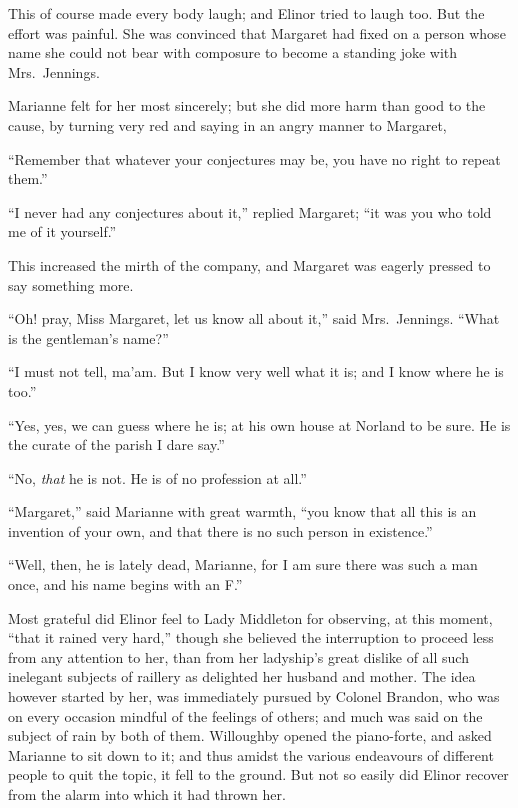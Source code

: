 \documentclass{article}
\begin{document}
This of course made every body laugh; and Elinor
tried to laugh too.  But the effort was painful.
She was convinced that Margaret had fixed on a person
whose name she could not bear with composure to become
a standing joke with Mrs.\ Jennings.

Marianne felt for her most sincerely; but she did
more harm than good to the cause, by turning very red
and saying in an angry manner to Margaret,

``Remember that whatever your conjectures may be,
you have no right to repeat them.''

``I never had any conjectures about it,'' replied Margaret;
``it was you who told me of it yourself.''

This increased the mirth of the company, and Margaret
was eagerly pressed to say something more.

``Oh! pray, Miss Margaret, let us know all about it,''
said Mrs.\ Jennings.  ``What is the gentleman's name?''

``I must not tell, ma'am. But I know very well what it is;
and I know where he is too.''

``Yes, yes, we can guess where he is; at his own house
at Norland to be sure.  He is the curate of the parish
I dare say.''

``No, \emph{that} he is not.  He is of no profession at all.''

``Margaret,'' said Marianne with great warmth,
``you know that all this is an invention of your own,
and that there is no such person in existence.''

``Well, then, he is lately dead, Marianne, for I
am sure there was such a man once, and his name begins
with an F.''

Most grateful did Elinor feel to Lady Middleton
for observing, at this moment, ``that it rained very hard,''
though she believed the interruption to proceed less from
any attention to her, than from her ladyship's great dislike
of all such inelegant subjects of raillery as delighted
her husband and mother.  The idea however started by her,
was immediately pursued by Colonel Brandon, who was
on every occasion mindful of the feelings of others;
and much was said on the subject of rain by both of them.
Willoughby opened the piano-forte, and asked Marianne
to sit down to it; and thus amidst the various endeavours
of different people to quit the topic, it fell to the ground.
But not so easily did Elinor recover from the alarm into
which it had thrown her.
\end{document}
